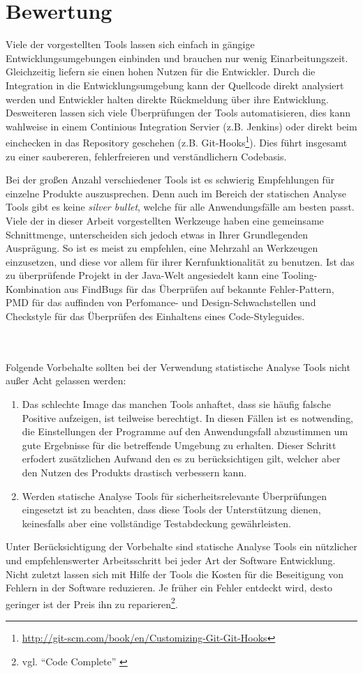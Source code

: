 \section{Bewertung}
Viele der vorgestellten Tools lassen sich einfach in gängige Entwicklungsumgebungen einbinden und brauchen nur wenig Einarbeitungszeit. Gleichzeitig liefern sie einen hohen Nutzen für die Entwickler. 
Durch die Integration in die Entwicklungsumgebung kann der Quellcode direkt analysiert werden und Entwickler halten direkte Rückmeldung über ihre Entwicklung. Desweiteren lassen sich viele Überprüfungen der Tools automatisieren, dies kann wahlweise in einem Continious Integration Servier (z.B. Jenkins) oder direkt beim einchecken in das Repository geschehen (z.B. Git-Hooks\footnote{\url{http://git-scm.com/book/en/Customizing-Git-Git-Hooks}}). Dies führt insgesamt zu einer saubereren, fehlerfreieren und verständlichern Codebasis.

Bei der großen Anzahl verschiedener Tools ist es schwierig Empfehlungen für einzelne Produkte auszusprechen. Denn auch im Bereich der statischen Analyse Tools gibt es keine \emph{silver bullet}, welche für alle Anwendungsfälle am besten passt. Viele der in dieser Arbeit vorgestellten Werkzeuge haben eine gemeinsame Schnittmenge, unterscheiden sich jedoch etwas in Ihrer Grundlegenden Ausprägung. So ist es meist zu empfehlen, eine Mehrzahl an Werkzeugen einzusetzen, und diese vor allem für ihrer Kernfunktionalität zu benutzen.
Ist das zu überprüfende Projekt in der Java-Welt angesiedelt kann eine Tooling-Kombination aus FindBugs für das Überprüfen auf bekannte Fehler-Pattern, PMD für das auffinden von Perfomance- und Design-Schwachstellen und Checkstyle für das Überprüfen des Einhaltens eines Code-Styleguides.


\\\\
Folgende Vorbehalte sollten bei der Verwendung statistische Analyse Tools nicht außer Acht gelassen werden:
\begin{enumerate}
  \item Das schlechte Image das manchen Tools anhaftet, dass sie häufig falsche Positive aufzeigen, ist teilweise berechtigt. In diesen Fällen ist es notwending, die Einstellungen der Programme auf den Anwendungsfall abzustimmen um gute Ergebnisse für die betreffende Umgebung zu erhalten. Dieser Schritt erfodert zusätzlichen Aufwand den es zu berücksichtigen gilt, welcher aber den Nutzen des Produkts drastisch verbessern kann.
  \item Werden statische Analyse Tools für sicherheitsrelevante Überprüfungen eingesetzt ist zu beachten, dass diese Tools der Unterstützung dienen, keinesfalls aber eine vollständige Testabdeckung gewährleisten.
\end{enumerate}

Unter Berücksichtigung der Vorbehalte sind statische Analyse Tools ein nützlicher und empfehlenswerter Arbeitsschritt bei jeder  Art der Software Entwicklung. Nicht zuletzt lassen sich mit Hilfe der Tools die Kosten für die Beseitigung von Fehlern in der Software reduzieren. Je früher ein Fehler entdeckt wird, desto geringer ist der Preis ihn zu reparieren\footnote{vgl. ``Code Complete'' \citep{mcconnell2004}}.
